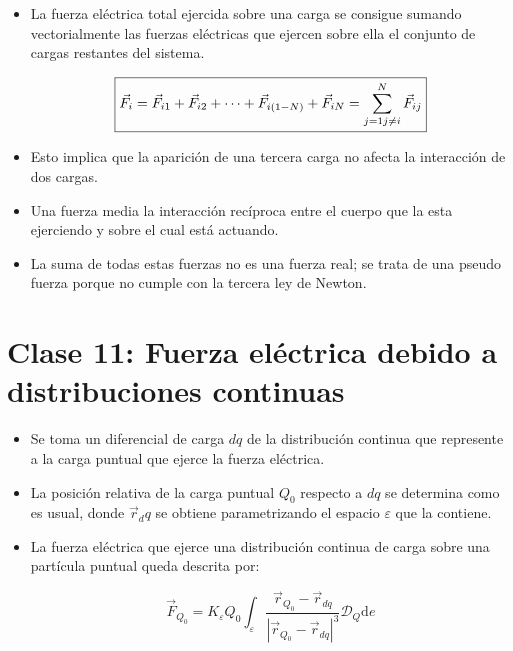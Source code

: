 \documentclass[a4paper,10pt]{article}
\begin{document}
\begin{itemize}

\item La fuerza el\'ectrica total ejercida sobre una carga se consigue sumando vectorialmente
las fuerzas el\'ectricas que ejercen sobre ella el conjunto de cargas restantes del sistema.

\begin{equation*}
    \boxed{\vec{F}_i=\vec{F}_{i1}+\vec{F}_{i2}+\cdots+\vec{F}_{i(1-N)}+\vec{F}_{iN}=
    \sum_{j=1\\j\neq i}^{N}\vec{F}_{ij}}
\end{equation*}

\item Esto implica que la aparici\'on de una tercera carga no afecta la interacci\'on de
dos cargas.

\item Una fuerza media la interacci\'on rec\'iproca entre el cuerpo que la esta ejerciendo y
sobre el cual est\'a actuando.

\item La suma de todas estas fuerzas no es una fuerza real; se trata de una pseudo fuerza
porque no cumple con la tercera ley de Newton.

\end{itemize}


\section*{Clase 11: Fuerza el\'ectrica debido a distribuciones continuas}

\begin{itemize}

\item Se toma un diferencial de carga $dq$ de la distribuci\'on continua que represente a la
carga puntual que ejerce la fuerza el\'ectrica.

\item La posición relativa de la carga puntual $Q_0$ respecto a $dq$ se determina como es
usual, donde $\vec{r}_dq$ se obtiene parametrizando el espacio $\varepsilon$ que la contiene. 

\item La fuerza el\'ectrica que ejerce una distribuci\'on continua de carga sobre una
part\'icula puntual queda descrita por:

\begin{equation*}
    \boxed{\vec{F}_{Q_0}=K_\varepsilon Q_{0}\int_{\varepsilon}\frac{\vec{r}_{Q_0}-\vec{r}_{dq}}
    {\left\lvert\vec{r}_{Q_0}-\vec{r}_{dq}\right\lvert^3}\mathcal{D}_{Q}\mathrm{d}e}
\end{equation*}

\end{itemize}
\end{document}
